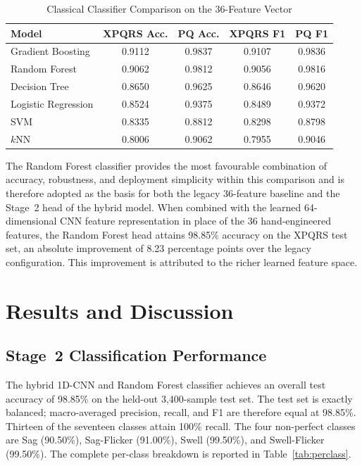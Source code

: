 \documentclass[conference]{IEEEtran}
\begin{document}
\begin{table}[!htbp]
  \centering
  \caption{Classical Classifier Comparison on the 36-Feature Vector}
  \label{tab:modelcmp}
  \footnotesize
  \setlength{\tabcolsep}{4pt}
  \renewcommand{\arraystretch}{1.2}
  \begin{tabular}{|l|c|c|c|c|}
    \hline
    Model & XPQRS Acc. & PQ Acc. & XPQRS F1 & PQ F1 \\
    \hline
    Gradient Boosting   & 0.9112 & 0.9837 & 0.9107 & 0.9836 \\
    \hline
    Random Forest       & 0.9062 & 0.9812 & 0.9056 & 0.9816 \\
    \hline
    Decision Tree       & 0.8650 & 0.9625 & 0.8646 & 0.9620 \\
    \hline
    Logistic Regression & 0.8524 & 0.9375 & 0.8489 & 0.9372 \\
    \hline
    SVM                 & 0.8335 & 0.8812 & 0.8298 & 0.8798 \\
    \hline
    $k$NN               & 0.8006 & 0.9062 & 0.7955 & 0.9046 \\
    \hline
  \end{tabular}
\end{table}

The Random Forest classifier provides the most favourable combination
of accuracy, robustness, and deployment simplicity within this
comparison and is therefore adopted as the basis for both the legacy
36-feature baseline and the Stage~2 head of the hybrid model. When
combined with the learned 64-dimensional CNN feature representation in
place of the 36 hand-engineered features, the Random Forest head
attains 98.85\% accuracy on the XPQRS test set, an absolute
improvement of 8.23 percentage points over the legacy configuration.
This improvement is attributed to the richer learned feature space.

\section{Results and Discussion}\label{sec:results}
\subsection{Stage~2 Classification Performance}\label{sec:headline}
The hybrid 1D-CNN and Random Forest classifier achieves an overall
test accuracy of 98.85\% on the held-out 3{,}400-sample test set. The
test set is exactly balanced; macro-averaged precision, recall, and
F1 are therefore equal at 98.85\%. Thirteen of the seventeen classes
attain 100\% recall. The four non-perfect classes are Sag (90.50\%),
Sag-Flicker (91.00\%), Swell (99.50\%), and Swell-Flicker (99.50\%).
The complete per-class breakdown is reported in
Table~\ref{tab:perclass}.
\end{document}
